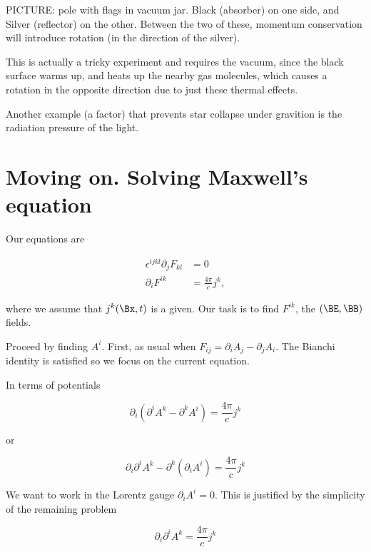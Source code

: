 PICTURE: pole with flags in vacuum jar.  Black (absorber) on one side, and Silver (reflector) on the other.  Between the two of these, momentum conservation will introduce rotation (in the direction of the silver).

This is actually a tricky experiment and requires the vacuum, since the black surface warms up, and heats up the nearby gas molecules, which causes a rotation in the opposite direction due to just these thermal effects.

Another example (a factor) that prevents star collapse under gravition is the radiation pressure of the light.

\section{Moving on.  Solving Maxwell's equation}

Our equations are

\begin{align}\label{eqn:relativisticElectrodynamicsL17:n}
\epsilon^{i j k l} \partial_j F_{k l} &= 0 \\
\partial_i F^{i k} &= \frac{4 \pi}{c} j^k,
\end{align}

where we assume that $j^k(\Bx, t)$ is a given.  Our task is to find $F^{i k}$, the $(\BE, \BB)$ fields.

Proceed by finding $A^i$.  First, as usual when $F_{i j} = \partial_i A_j - \partial_j A_i$.  The Bianchi identity is satisfied so we focus on the current equation.

In terms of potentials

\begin{equation}\label{eqn:relativisticElectrodynamicsL17:n}
\partial_i (\partial^i A^k - \partial^k A^i) = \frac{ 4 \pi}{c} j^k
\end{equation}

or

\begin{equation}\label{eqn:relativisticElectrodynamicsL17:n}
\partial_i \partial^i A^k - \partial^k (\partial_i A^i) = \frac{ 4 \pi}{c} j^k
\end{equation}

We want to work in the Lorentz gauge $\partial_i A^i = 0$.  This is justified by the simplicity of the remaining problem

\begin{equation}\label{eqn:relativisticElectrodynamicsL17:n}
\partial_i \partial^i A^k = \frac{4 \pi}{c} j^k
\end{equation}

